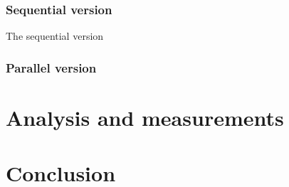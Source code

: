 \documentclass{article}
\begin{document}
\subsubsection{Sequential version}
The sequential version
\subsubsection{Parallel version}
\section{Analysis and measurements}
\section{Conclusion}
\end{document}

